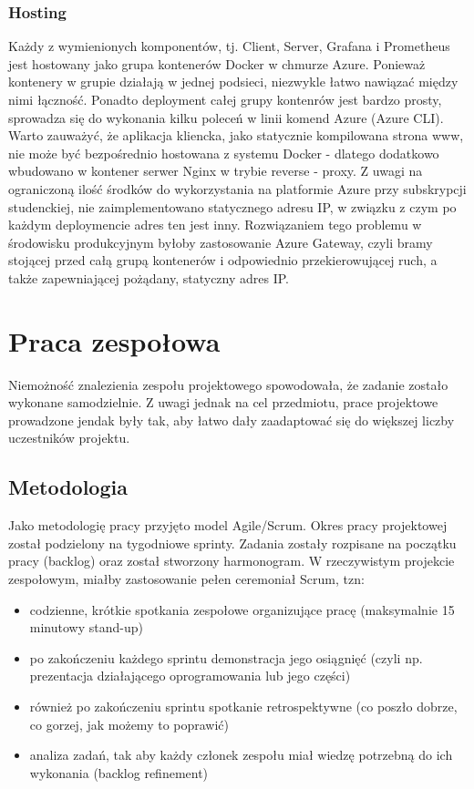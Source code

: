 \documentclass[10pt,a4paper]{article}
\begin{document}
		\subsubsection{Hosting}
		Każdy z wymienionych komponentów, tj. Client, Server, Grafana i Prometheus jest hostowany jako grupa kontenerów Docker w chmurze Azure. Ponieważ kontenery w grupie działają w jednej podsieci, niezwykle łatwo nawiązać między nimi łączność. Ponadto deployment całej grupy kontenrów jest bardzo prosty, sprowadza się do wykonania kilku poleceń w linii komend Azure (Azure CLI). Warto zauważyć, że aplikacja kliencka, jako statycznie kompilowana strona www, nie może być bezpośrednio hostowana z systemu Docker - dlatego dodatkowo wbudowano w kontener serwer Nginx w trybie reverse - proxy. Z uwagi na ograniczoną ilość środków do wykorzystania na platformie Azure przy subskrypcji studenckiej, nie zaimplementowano statycznego adresu IP, w związku z czym po każdym deploymencie adres ten jest inny. Rozwiązaniem tego problemu w środowisku produkcyjnym byłoby zastosowanie Azure Gateway, czyli bramy stojącej przed całą grupą kontenerów i odpowiednio przekierowującej ruch, a także zapewniającej pożądany, statyczny adres IP.
		
		\section{Praca zespołowa}
		Niemożność znalezienia zespołu projektowego spowodowała, że zadanie zostało wykonane samodzielnie. Z uwagi jednak na cel przedmiotu, prace projektowe prowadzone jendak były tak, aby łatwo dały zaadaptować się do większej liczby uczestników projektu.
		
		\subsection{Metodologia}
		Jako metodologię pracy przyjęto model Agile/Scrum. Okres pracy projektowej został podzielony na tygodniowe sprinty. Zadania zostały rozpisane na początku pracy (backlog) oraz został stworzony harmonogram. 
		W rzeczywistym projekcie zespołowym, miałby zastosowanie pełen ceremoniał Scrum, tzn:
		\begin{itemize}
			\item codzienne, krótkie spotkania zespołowe organizujące pracę (maksymalnie 15 minutowy stand-up)
			\item po zakończeniu każdego sprintu demonstracja jego osiągnięć (czyli np. prezentacja działającego oprogramowania lub jego części)
			\item również po zakończeniu sprintu spotkanie retrospektywne (co poszło dobrze, co gorzej, jak możemy to poprawić)
			\item analiza zadań, tak aby każdy członek zespołu miał wiedzę potrzebną do ich wykonania (backlog refinement)
		\end{itemize}
		
\end{document}
